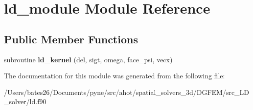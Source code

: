 \hypertarget{classld__module}{\section{ld\+\_\+module Module Reference}
\label{classld__module}
}
\subsection*{Public Member Functions}
\begin{DoxyCompactItemize}
\item 
\hypertarget{classld__module_a7b1e55ba9bbc02396f0a489ad630cfde}{subroutine {\bfseries ld\+\_\+kernel} (del, sigt, omega, face\+\_\+psi, vecx)}\label{classld__module_a7b1e55ba9bbc02396f0a489ad630cfde}

\end{DoxyCompactItemize}


The documentation for this module was generated from the following file\+:\begin{DoxyCompactItemize}
\item 
/\+Users/bates26/\+Documents/pyne/src/ahot/spatial\+\_\+solvers\+\_\+3d/\+D\+G\+F\+E\+M/src\+\_\+\+L\+D\+\_\+solver/ld.\+f90\end{DoxyCompactItemize}
